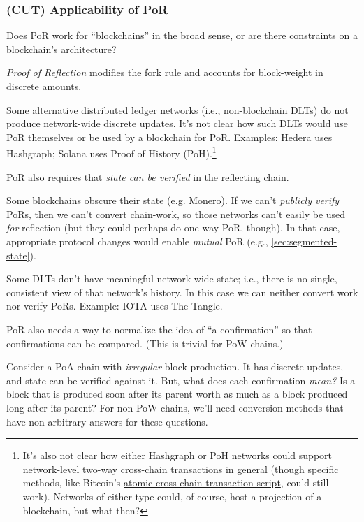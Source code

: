 
\subsubsection{(CUT) Applicability of PoR}

\label{sec:applicability-of-por}

Does PoR work for ``blockchains'' in the broad sense, or are there constraints on a blockchain's architecture?

\emph{Proof of Reflection} modifies the fork rule and accounts for block-weight in discrete amounts.

Some alternative distributed ledger networks (i.e., non-blockchain DLTs) do not produce network-wide discrete updates.
It's not clear how such DLTs would use PoR themselves or be used by a blockchain for PoR.
Examples: Hedera uses Hashgraph; Solana uses Proof of History (PoH).\footnote{
  It's also not clear how either Hashgraph or PoH networks could support network-level two-way cross-chain transactions in general (though specific methods, like Bitcoin's \href{https://en.bitcoin.it/wiki/Contract\#Example_5:_Trading_across_chains}{atomic cross-chain transaction script}, could still work).
  Networks of either type could, of course, host a projection of a blockchain, but what then?
}

PoR also requires that \emph{state can be verified} in the reflecting chain.

Some blockchains obscure their state (e.g. Monero).
If we can't \emph{publicly verify} PoRs, then we can't convert chain-work, so those networks can't easily be used \emph{for} reflection (but they could perhaps do one-way PoR, though).
In that case, appropriate protocol changes would enable \emph{mutual} PoR (e.g., \autoref{sec:segmented-state}).

Some DLTs don't have meaningful network-wide state; i.e., there is no single, consistent view of that network's history.
In this case we can neither convert work nor verify PoRs.
Example: IOTA uses The Tangle.

PoR also needs a way to normalize the idea of ``a confirmation'' so that confirmations can be compared. (This is trivial for PoW chains.)

Consider a PoA chain with \emph{irregular} block production.
It has discrete updates, and state can be verified against it.
But, what does each confirmation \emph{mean?}
Is a block that is produced soon after its parent worth as much as a block produced long after its parent?
For non-PoW chains, we'll need conversion methods that have non-arbitrary answers for these questions.

